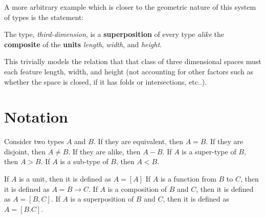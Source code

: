 \documentclass{article}
\begin{document}
A more arbitrary example which is closer to the geometric nature of this system of types is the statement: 
\begin{center} 
The type, \textit{third-dimension}, is a \textbf{superposition} of every type \textit{alike} the \textbf{composite} of the \textbf{units} \textit{length}, \textit{width}, and \textit{height}.
\end{center}
This trivially models the relation that that class of three dimensional spaces must each feature length, width, and height (not accounting for other factors such as whether the space is closed, if it has folds or intersections, etc..).

\section*{Notation}

Consider two types $A$ and $B$. If they are equivalent, then $A = B$. If they are disjoint, then $A \neq B$. If they are alike, then $A - B$. If $A$ is a super-type of $B$, then $A > B$. If $A$ is a sub-type of $B$, then $A < B$.

If $A$ is a unit, then it is defined as $A = [A]$ If $A$ is a function from $B$ to $C$, then it is defined as $A = B \rightarrow C$. If $A$ is a composition of $B$ and $C$, then it is defined as $A = [B,C]$. If $A$ is a superposition of $B$ and $C$, then it is defined as $A = [B.C]$.
\end{document}
